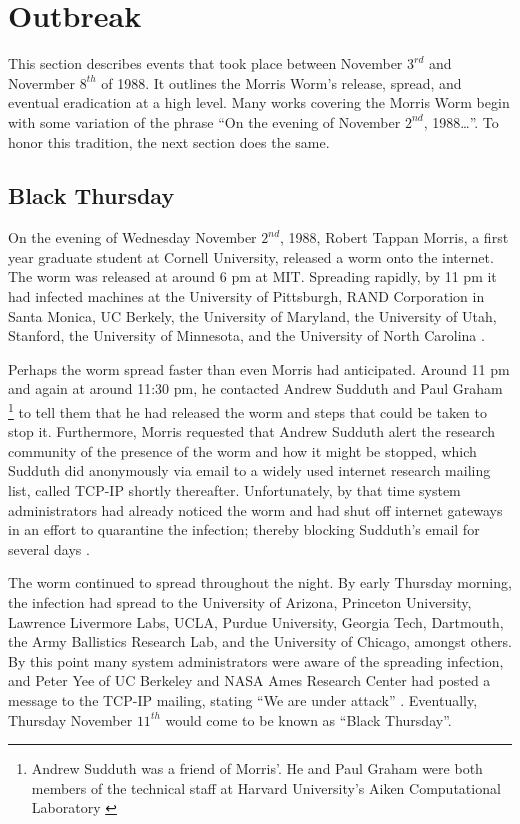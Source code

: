 \section*{Outbreak}
This section describes events that took place between November $3^{rd}$ and
Novermber $8^{th}$ of 1988. It outlines the Morris Worm's release, spread, and
eventual eradication at a high level.
Many works covering the Morris Worm begin with some variation of the phrase
``On the evening of November $2^{nd}$, 1988\ldots''.
To honor this tradition, the next section does the same. 

\subsection*{Black Thursday}

On the evening of Wednesday November $2^{nd}$, 1988, Robert Tappan Morris, a
first year graduate student at Cornell University, released a worm onto the
internet. The worm was released at around 6 pm at MIT. Spreading rapidly, by 11
pm it had infected machines at
the University of Pittsburgh,
RAND Corporation in Santa Monica,
UC Berkely,
the University of Maryland,
the University of Utah,
Stanford,
the University of Minnesota,
and the University of North Carolina
\cite{seeley_tour_1989,
spafford_internet_1989-1}.

Perhaps the worm spread faster than even Morris had anticipated. Around
11 pm and again at around 11:30 pm, he contacted Andrew Sudduth and Paul Graham
\footnote{
Andrew Sudduth was a friend of Morris'. He and Paul Graham were both
members of the technical staff at Harvard University's Aiken Computational
Laboratory \cite{lee_washpost_2013}
}
to tell them that he had released the worm and steps that could be taken to stop
it. Furthermore, Morris requested that Andrew Sudduth alert the research
community of the presence of the worm and how it might be stopped, which
Sudduth did anonymously via email to a widely used internet research mailing
list, called TCP-IP shortly thereafter.
Unfortunately, by that time system administrators had already noticed the worm and had shut off
internet gateways in an effort to quarantine the infection; thereby blocking
Sudduth's email for several days
\cite{lee_washpost_2013}\cite{eisenberg_cornell_1989}.

The worm continued to spread throughout the night. By early Thursday morning,
the infection had spread to the University of Arizona, Princeton University,
Lawrence Livermore Labs, UCLA, Purdue University, Georgia Tech, Dartmouth,
the Army Ballistics Research Lab, and the University of Chicago, amongst others.
By this point many system administrators were aware of the spreading infection, and Peter Yee of UC Berkeley and NASA
Ames Research Center had posted a message to the TCP-IP mailing, stating ``We
are under attack''\cite{seeley_tour_1989}
\cite{spafford_internet_1989-1}. Eventually, Thursday November $11^{th}$ would
come to be known as ``Black Thursday''. 

